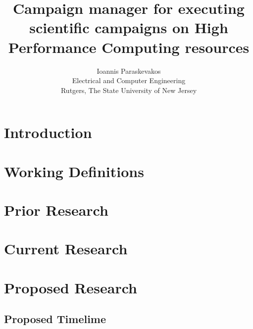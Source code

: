 

\title{Campaign manager for executing scientific campaigns on High Performance Computing resources}
\author{Ioannis Paraskevakos \\	Electrical and Computer Engineering \\
        Rutgers, The State University of New Jersey}
\date{}

\maketitle


\section{Introduction}


\section{Working Definitions}


\section{Prior Research}


\section{Current Research}


\section{Proposed Research}


\subsection{Proposed Timelime}




